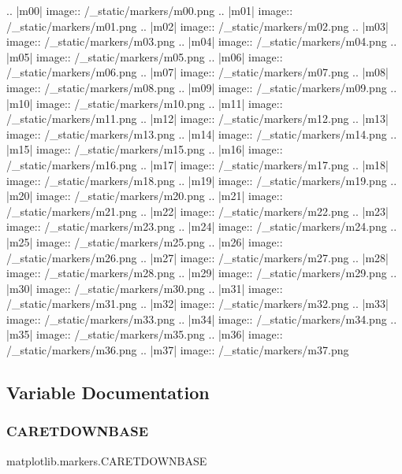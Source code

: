 \begin{DoxyVerb}
.. |m00| image:: /_static/markers/m00.png
.. |m01| image:: /_static/markers/m01.png
.. |m02| image:: /_static/markers/m02.png
.. |m03| image:: /_static/markers/m03.png
.. |m04| image:: /_static/markers/m04.png
.. |m05| image:: /_static/markers/m05.png
.. |m06| image:: /_static/markers/m06.png
.. |m07| image:: /_static/markers/m07.png
.. |m08| image:: /_static/markers/m08.png
.. |m09| image:: /_static/markers/m09.png
.. |m10| image:: /_static/markers/m10.png
.. |m11| image:: /_static/markers/m11.png
.. |m12| image:: /_static/markers/m12.png
.. |m13| image:: /_static/markers/m13.png
.. |m14| image:: /_static/markers/m14.png
.. |m15| image:: /_static/markers/m15.png
.. |m16| image:: /_static/markers/m16.png
.. |m17| image:: /_static/markers/m17.png
.. |m18| image:: /_static/markers/m18.png
.. |m19| image:: /_static/markers/m19.png
.. |m20| image:: /_static/markers/m20.png
.. |m21| image:: /_static/markers/m21.png
.. |m22| image:: /_static/markers/m22.png
.. |m23| image:: /_static/markers/m23.png
.. |m24| image:: /_static/markers/m24.png
.. |m25| image:: /_static/markers/m25.png
.. |m26| image:: /_static/markers/m26.png
.. |m27| image:: /_static/markers/m27.png
.. |m28| image:: /_static/markers/m28.png
.. |m29| image:: /_static/markers/m29.png
.. |m30| image:: /_static/markers/m30.png
.. |m31| image:: /_static/markers/m31.png
.. |m32| image:: /_static/markers/m32.png
.. |m33| image:: /_static/markers/m33.png
.. |m34| image:: /_static/markers/m34.png
.. |m35| image:: /_static/markers/m35.png
.. |m36| image:: /_static/markers/m36.png
.. |m37| image:: /_static/markers/m37.png
\end{DoxyVerb}
 

\subsection{Variable Documentation}
\mbox{\label{namespacematplotlib_1_1markers_ad59a941a1c452731fa5d0fa01f163891}} 
\subsubsection{\texorpdfstring{C\+A\+R\+E\+T\+D\+O\+W\+N\+B\+A\+SE}{CARETDOWNBASE}}
{\footnotesize\ttfamily matplotlib.\+markers.\+C\+A\+R\+E\+T\+D\+O\+W\+N\+B\+A\+SE}

